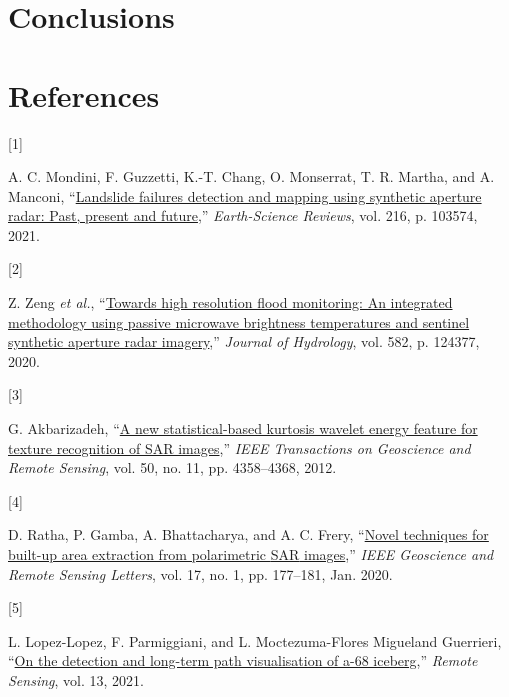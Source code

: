 \documentclass[
  lettersize  journal,
]{IEEEtran}%
\newlength{\cslhangindent}
\newlength{\csllabelwidth}
\newenvironment{CSLReferences}[2] %
 {\begin{list}{}{%
  \setlength{\itemindent}{0pt}
  \setlength{\leftmargin}{0pt}
  \setlength{\parsep}{0pt}
  \ifodd #1
   \setlength{\leftmargin}{\cslhangindent}
   \setlength{\itemindent}{-1\cslhangindent}
  \fi
  \setlength{\itemsep}{#2\baselineskip}}}
 {\end{list}}
\newcommand{\CSLLeftMargin}[1]{\parbox[t]{\csllabelwidth}{\strut#1\strut}}
\newcommand{\CSLRightInline}[1]{\parbox[t]{\linewidth - \csllabelwidth}{\strut#1\strut}}
\begin{document}
\section{Conclusions}\label{sec:conclusion}

\section*{References}\label{references}

\label{refs}
\begin{CSLReferences}{0}{0}
\CSLLeftMargin{{[}1{]} }%
\CSLRightInline{A. C. Mondini, F. Guzzetti, K.-T. Chang, O. Monserrat,
T. R. Martha, and A. Manconi,
{``\href{https://doi.org/10.1016/j.earscirev.2021.103574}{Landslide
failures detection and mapping using synthetic aperture radar: Past,
present and future},''} \emph{Earth-Science Reviews}, vol. 216, p.
103574, 2021. }

\CSLLeftMargin{{[}2{]} }%
\CSLRightInline{Z. Zeng \emph{et al.},
{``\href{https://doi.org/10.1016/j.jhydrol.2019.124377}{Towards high
resolution flood monitoring: An integrated methodology using passive
microwave brightness temperatures and sentinel synthetic aperture radar
imagery},''} \emph{Journal of Hydrology}, vol. 582, p. 124377, 2020. }

\CSLLeftMargin{{[}3{]} }%
\CSLRightInline{G. Akbarizadeh,
{``\href{https://doi.org/10.1109/tgrs.2012.2194787}{A new
statistical-based kurtosis wavelet energy feature for texture
recognition of SAR images},''} \emph{IEEE Transactions on Geoscience and
Remote Sensing}, vol. 50, no. 11, pp. 4358--4368, 2012. }

\CSLLeftMargin{{[}4{]} }%
\CSLRightInline{D. Ratha, P. Gamba, A. Bhattacharya, and A. C. Frery,
{``\href{https://doi.org/10.1109/LGRS.2019.2914913}{Novel techniques for
built-up area extraction from polarimetric {SAR} images},''} \emph{IEEE
Geoscience and Remote Sensing Letters}, vol. 17, no. 1, pp. 177--181,
Jan. 2020. }

\CSLLeftMargin{{[}5{]} }%
\CSLRightInline{L. Lopez-Lopez, F. Parmiggiani, and L. Moctezuma-Flores
Migueland Guerrieri, {``\href{https://doi.org/10.3390/rs13030460}{On the
detection and long-term path visualisation of a-68 iceberg},''}
\emph{Remote Sensing}, vol. 13, 2021. }


\end{CSLReferences}
\end{document}
